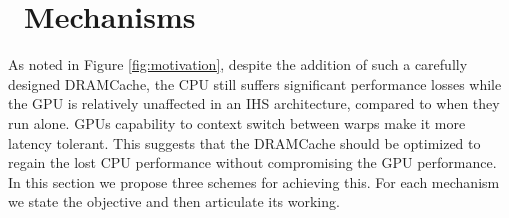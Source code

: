 \section{\cachename\ Mechanisms}

As noted  in Figure \ref{fig:motivation}, despite the addition of such a carefully designed DRAMCache, the CPU still suffers significant performance losses while the GPU is relatively unaffected in an IHS architecture, compared to when they run alone. GPUs capability to context switch between warps make it more latency tolerant. This suggests that the DRAMCache should be optimized to regain the lost CPU performance without compromising the GPU performance. In this section we propose three schemes for achieving this. For each mechanism we state the objective and then articulate its working.


